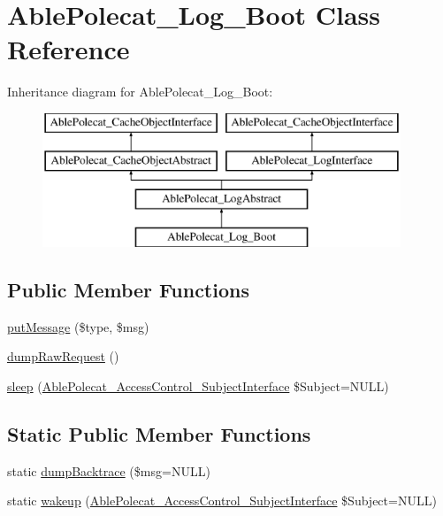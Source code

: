 \hypertarget{class_able_polecat___log___boot}{}\section{Able\+Polecat\+\_\+\+Log\+\_\+\+Boot Class Reference}
\label{class_able_polecat___log___boot}
Inheritance diagram for Able\+Polecat\+\_\+\+Log\+\_\+\+Boot\+:\begin{figure}[H]
\begin{center}
\leavevmode
\includegraphics[height=4.000000cm]{class_able_polecat___log___boot}
\end{center}
\end{figure}
\subsection*{Public Member Functions}
\begin{DoxyCompactItemize}
\item 
\hyperlink{class_able_polecat___log___boot_a952026c3d234eb84a9f211b17f33a110}{put\+Message} (\$type, \$msg)
\item 
\hyperlink{class_able_polecat___log___boot_a7ff663c06389cd07f8da470eb5a0fbeb}{dump\+Raw\+Request} ()
\item 
\hyperlink{class_able_polecat___log___boot_a365e24d7b066205cafa2a5cce3a4f224}{sleep} (\hyperlink{interface_able_polecat___access_control___subject_interface}{Able\+Polecat\+\_\+\+Access\+Control\+\_\+\+Subject\+Interface} \$Subject=N\+U\+L\+L)
\end{DoxyCompactItemize}
\subsection*{Static Public Member Functions}
\begin{DoxyCompactItemize}
\item 
static \hyperlink{class_able_polecat___log___boot_a14ff5571692e0aa15198dcf433727839}{dump\+Backtrace} (\$msg=N\+U\+L\+L)
\item 
static \hyperlink{class_able_polecat___log___boot_a3f2135f6ad45f51d075657f6d20db2cd}{wakeup} (\hyperlink{interface_able_polecat___access_control___subject_interface}{Able\+Polecat\+\_\+\+Access\+Control\+\_\+\+Subject\+Interface} \$Subject=N\+U\+L\+L)
\end{DoxyCompactItemize}
